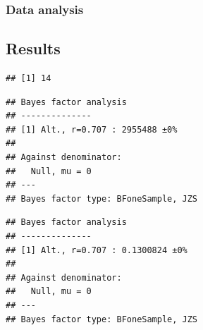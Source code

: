 \documentclass[english,man]{apa7}
\begin{document}
\hypertarget{data-analysis}{%
\subsubsection{Data analysis}\label{data-analysis}}

\hypertarget{results}{%
\subsection{Results}\label{results}}

\begin{verbatim}
## [1] 14
\end{verbatim}

\begin{verbatim}
## Bayes factor analysis
## --------------
## [1] Alt., r=0.707 : 2955488 ±0%
## 
## Against denominator:
##   Null, mu = 0 
## ---
## Bayes factor type: BFoneSample, JZS
\end{verbatim}

\begin{verbatim}
## Bayes factor analysis
## --------------
## [1] Alt., r=0.707 : 0.1300824 ±0%
## 
## Against denominator:
##   Null, mu = 0 
## ---
## Bayes factor type: BFoneSample, JZS
\end{verbatim}
\end{document}
